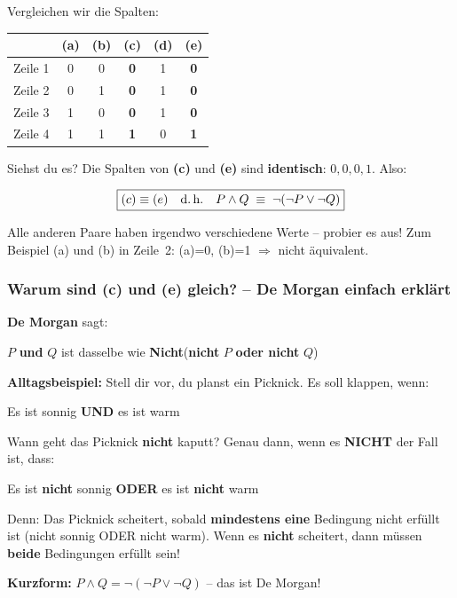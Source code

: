 \documentclass[a4paper,12pt]{article}
\begin{document}
Vergleichen wir die Spalten:
\begin{center}
\renewcommand{\arraystretch}{1.2}
\begin{tabular}{c|ccccc}
 & (a) & (b) & (c) & (d) & (e) \\
\midrule
Zeile 1 & 0 & 0 & \textbf{0} & 1 & \textbf{0} \\
Zeile 2 & 0 & 1 & \textbf{0} & 1 & \textbf{0} \\
Zeile 3 & 1 & 0 & \textbf{0} & 1 & \textbf{0} \\
Zeile 4 & 1 & 1 & \textbf{1} & 0 & \textbf{1} \\
\end{tabular}
\end{center}

Siehst du es? Die Spalten von \textbf{(c)} und \textbf{(e)} sind \textbf{identisch}: $0, 0, 0, 1$. Also:

\[
\boxed{(c) \equiv (e) \quad\text{d.\,h.}\quad P \wedge Q \;\equiv\; \neg(\neg P \vee \neg Q)}
\]

Alle anderen Paare haben irgendwo verschiedene Werte -- probier es aus! Zum Beispiel (a) und (b) in Zeile~2: (a)=0, (b)=1 $\Rightarrow$ nicht \"aquivalent.

\subsubsection*{Warum sind (c) und (e) gleich? -- De Morgan einfach erkl\"art}

\begin{analogie}
\textbf{De Morgan} sagt:

\glqq$P$ \textbf{und} $Q$\grqq{} ist dasselbe wie \glqq\textbf{Nicht}(\textbf{nicht} $P$ \textbf{oder nicht} $Q$)\grqq{}

\medskip
\textbf{Alltagsbeispiel:} Stell dir vor, du planst ein Picknick. Es soll klappen, wenn:

\glqq Es ist sonnig \textbf{UND} es ist warm\grqq{}

\medskip
Wann geht das Picknick \textbf{nicht} kaputt? Genau dann, wenn es \textbf{NICHT} der Fall ist, dass:

\glqq Es ist \textbf{nicht} sonnig \textbf{ODER} es ist \textbf{nicht} warm\grqq{}

\medskip
Denn: Das Picknick scheitert, sobald \textbf{mindestens eine} Bedingung nicht erf\"ullt ist (nicht sonnig ODER nicht warm). Wenn es \textbf{nicht} scheitert, dann m\"ussen \textbf{beide} Bedingungen erf\"ullt sein!

\medskip
\textbf{Kurzform:} $P \wedge Q = \neg(\neg P \vee \neg Q)$ \quad -- das ist De Morgan!
\end{analogie}
\end{document}
